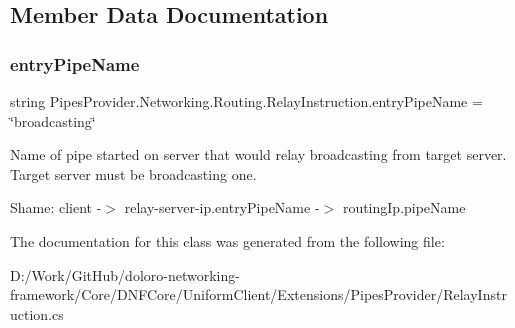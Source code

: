 \subsection{Member Data Documentation}
\mbox{\label{class_pipes_provider_1_1_networking_1_1_routing_1_1_relay_instruction_ab5f83b58775b783a3dc4d4ad2d9ffb81}} 
\subsubsection{\texorpdfstring{entry\+Pipe\+Name}{entryPipeName}}
{\footnotesize\ttfamily string Pipes\+Provider.\+Networking.\+Routing.\+Relay\+Instruction.\+entry\+Pipe\+Name = \char`\"{}broadcasting\char`\"{}}



Name of pipe started on server that would relay broadcasting from target server. Target server must be broadcasting one. 

Shame\+: client -\/$>$ relay-\/server-\/ip.\+entry\+Pipe\+Name -\/$>$ routing\+Ip.\+pipe\+Name 

The documentation for this class was generated from the following file\+:\begin{DoxyCompactItemize}
\item 
D\+:/\+Work/\+Git\+Hub/doloro-\/networking-\/framework/\+Core/\+D\+N\+F\+Core/\+Uniform\+Client/\+Extensions/\+Pipes\+Provider/Relay\+Instruction.\+cs\end{DoxyCompactItemize}
